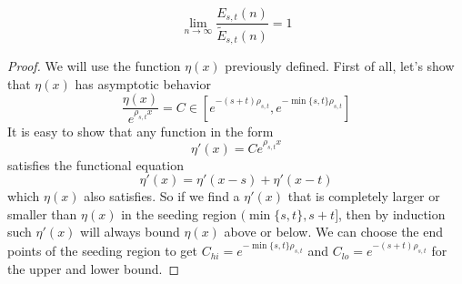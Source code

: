 \documentclass[]{article}
\begin{document}
\vspace{1cm}
\begin{lemma}[$E$ limit]
	\[
	\lim_{n\to\infty}\frac{E_{s,t}(n)}{\tilde{E}_{s,t}(n)} = 1
	\]
\end{lemma}
\begin{proof}

	We will use the function $\eta(x)$ previously defined. First of all, let's show that $\eta(x)$ has asymptotic behavior
	\[
	\frac{\eta(x)}{e^{\rho_{s,t} x}} = C \in [e^{-(s+t)\rho_{s,t}},e^{-\min\{s,t\}\rho_{s,t}}]
	\]
	It is easy to show that any function in the form
	\[
	\eta'(x) = C e^{\rho_{s,t} x}
	\]
	satisfies the functional equation
	\[
	\eta'(x) = \eta'(x - s) + \eta'(x - t)
	\]
	which $\eta(x)$ also satisfies. So if we find a $\eta'(x)$ that is completely larger or smaller than $\eta(x)$ in the seeding region $(\min\{s,t\}, s+t]$, then by induction such $\eta'(x)$ will always bound $\eta(x)$ above or below. We can choose the end points of the seeding region to get $C_{hi} = e^{-\min\{s,t\}\rho_{s,t}}$ and $C_{lo} = e^{-(s+t)\rho_{s,t}}$ for the upper and lower bound.


\end{proof}
\end{document}
